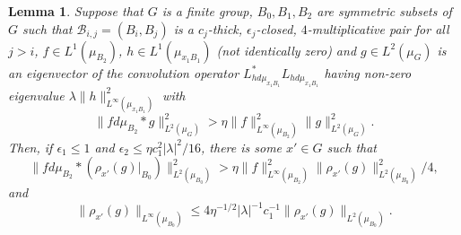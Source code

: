 \documentclass[12pt]{amsart}
\numberwithin{equation}{section}
\theoremstyle{plain}
\newtheorem{lemma}[subsection]{Lemma}
\theoremstyle{definition}
\renewcommand{\leq}{\leqslant}
\begin{document}
\begin{lemma}\label{lem.chopup}
Suppose that $G$ is a finite group, $B_0,B_1,B_2$ are symmetric subsets of $G$ such that $\mathcal{B}_{i,j}=(B_i,B_j)$ is a $c_j$-thick, $\epsilon_j$-closed, $4$-multiplicative pair for all $j>i$, $f\in L^1(\mu_{B_2})$, $h \in L^1(\mu_{x_1B_1})$ (not identically zero) and $g \in L^2(\mu_G)$ is an eigenvector of the convolution operator $ L_{hd\mu_{x_1B_1}}^* L_{hd\mu_{x_1B_1}}$ having non-zero eigenvalue $\lambda \|h\|_{L^\infty(\mu_{x_1B_1})}^2$ with
\begin{equation*}
\|fd\mu_{B_2} \ast g\|_{L^2(\mu_G)}^2 > \eta\|f\|_{L^\infty(\mu_{B_2})}^2\|g\|_{L^2(\mu_G)}^2.
\end{equation*}
Then, if $\epsilon_1 \leq 1$ and $\epsilon_2 \leq \eta c_1^2|\lambda|^2/16$, there is some $x' \in G$ such that
\begin{equation*}
\|fd\mu_{B_2} \ast (\rho_{x'}(g)|_{B_0})\|_{L^2(\mu_{B_0})}^2 > \eta \|f\|_{L^\infty(\mu_{B_2})}^2\|\rho_{x'}(g)\|_{L^2(\mu_{B_0})}^2/4,
\end{equation*}
and
\begin{equation*}
\|\rho_{x'}(g)\|_{L^\infty(\mu_{B_0})}\leq 4\eta^{-1/2}|\lambda|^{-1}c_1^{-1}\|\rho_{x'}(g)\|_{L^2(\mu_{B_0})}.
\end{equation*}
\end{lemma}
\end{document}
